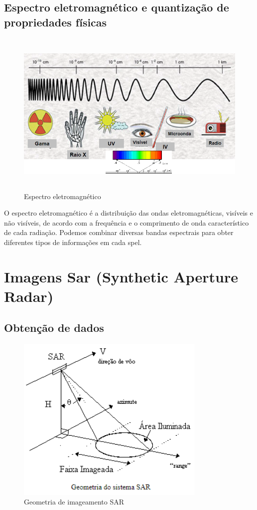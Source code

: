 \documentclass[12pt, a4paper]{article}
\begin{document}
    \subsection{Espectro eletromagnético e quantização de propriedades físicas}
    \vspace{4mm}
    \begin{figure}[!htb]
    	\centering
    	\includegraphics[height = 8cm]{Screenshot_7}
    	\caption{Espectro eletromagnético}
    	\label{figRotulo}
  	\end{figure}
    \vspace{4mm}
    O espectro eletromagnético é a distribuição das ondas eletromagnéticas, visíveis e não visíveis, de acordo com a frequência e o comprimento de onda característico de cada radiação. Podemos combinar diversas bandas espectrais para obter diferentes tipos de informações em cada spel.
    
    \newpage
    \section{Imagens Sar (Synthetic Aperture Radar)}
    \subsection{Obtenção de dados}
    
    \begin{figure}[!htb]
    	\centering
    	\includegraphics[height = 8cm]{Screenshot_9}
    	\caption{Geometria de imageamento SAR}
    	\label{figRotulo}
  	\end{figure}
    
\end{document}
